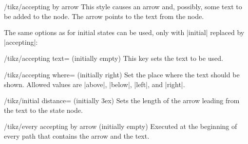 \begin{stylekey}{/tikz/accepting by arrow}
    This style causes an arrow and, possibly, some text to be added to the
    node. The arrow points to the text from the node.

    The same options as for initial states can be used, only with |initial|
    replaced by |accepting|:
    \begin{key}{/tikz/accepting text= (initially \normalfont empty)}
        This key sets the text to be used.
    \end{key}
    \begin{key}{/tikz/accepting where= (initially right)}
        Set the place where the text should be shown. Allowed values are
        |above|, |below|, |left|, and |right|.
    \end{key}
    \begin{key}{/tikz/initial distance= (initially 3ex)}
        Sets the length of the arrow leading from the text to the state
        node.
    \end{key}
    \begin{stylekey}{/tikz/every accepting by arrow (initially \normalfont empty)}
        Executed at the beginning of every path that contains the arrow and the
        text.
    \end{stylekey}
\begin{codeexample}[preamble={\usetikzlibrary{arrows,positioning}}]
\end{codeexample}
\end{stylekey}

